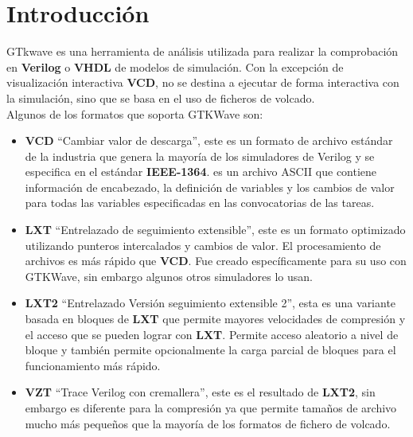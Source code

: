 \documentclass[10pt,graphicx,caption,rotating]{article}
\begin{document}
\section{Introducción}
\noindent
GTkwave es una herramienta de análisis utilizada para realizar la comprobación en \textbf{Verilog} o \textbf{VHDL} de modelos de simulación. Con la excepción de visualización interactiva \textbf{VCD}, no se destina a ejecutar de forma interactiva con la simulación, sino que se basa en el uso de ficheros de volcado.\\
Algunos de los formatos que soporta GTKWave son:
\begin{itemize}
 \item \textbf{VCD} ``Cambiar valor de descarga'', este es un formato de archivo estándar de la industria que genera la mayoría de los simuladores de Verilog y se especifica en el estándar \textbf{IEEE-1364}. es un archivo ASCII que contiene información de encabezado, la definición de variables y los cambios de valor para todas las variables especificadas en las convocatorias de las tareas.
 \item \textbf{LXT} ``Entrelazado de seguimiento extensible'', este es un formato optimizado utilizando punteros intercalados y cambios de valor. El procesamiento de archivos es más rápido que \textbf{VCD}. Fue creado específicamente para su uso con GTKWave, sin embargo algunos otros simuladores lo usan.
 \item \textbf{LXT2} ``Entrelazado Versión seguimiento extensible 2'', esta es una variante basada en bloques de \textbf{LXT} que permite mayores velocidades de compresión y el acceso que se pueden lograr con \textbf{LXT}. Permite acceso aleatorio a nivel de bloque y también permite opcionalmente la carga parcial de bloques para el funcionamiento más rápido.
 \item \textbf{VZT} ``Trace Verilog con cremallera'', este es el resultado de \textbf{LXT2}, sin embargo es diferente para la compresión ya que permite tamaños de archivo mucho más pequeños que la mayoría de los formatos de fichero de volcado.
\end{itemize}
\end{document}
